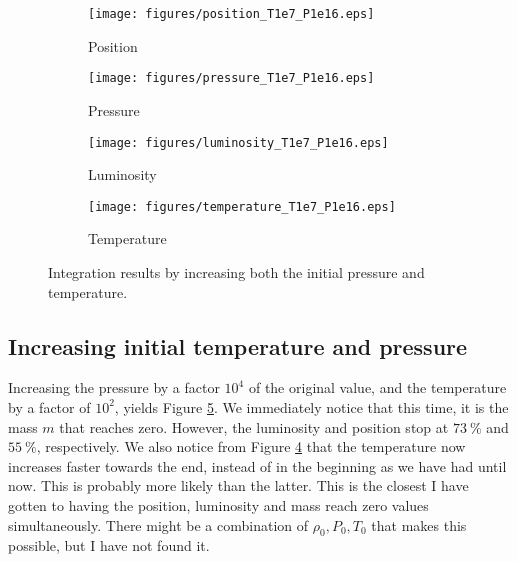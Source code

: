 \documentclass[a4paper, 11pt, english]{article}
\newcommand{\refig}[1]{\textcolor{blue}{\ref{fig:#1}}} %
\begin{document}
\begin{figure}[htpb]
	\begin{subfigure}{0.49\textwidth}
		\texttt{[image: figures/position\_T1e7\_P1e16.eps]}
		\caption{Position}
		\label{fig:position_T1e7_P1e16}
	\end{subfigure}\hfill
	\begin{subfigure}{0.49\textwidth}
		\texttt{[image: figures/pressure\_T1e7\_P1e16.eps]}
		\caption{Pressure}
		\label{fig:pressure_T1e7_P1e16}
	\end{subfigure}\hfill
	\vspace{0.35cm}
	\begin{subfigure}{0.49\textwidth}
		\texttt{[image: figures/luminosity\_T1e7\_P1e16.eps]}
		\caption{Luminosity}
		\label{fig:luminosity_T1e7_P1e16}
	\end{subfigure}\hfill
	\begin{subfigure}{0.49\textwidth}
		\texttt{[image: figures/temperature\_T1e7\_P1e16.eps]}
		\caption{Temperature}
		\label{fig:temperature_T1e7_P1e16}
	\end{subfigure}
	\vspace{0.2cm}
	\caption{Integration results by increasing both the initial pressure and temperature.}
	\label{fig:T1e7_P1e16}
\end{figure}

\subsection{Increasing initial temperature and pressure}
Increasing the pressure by a factor $10^4$ of the original value, and the temperature by a
factor of $10^2$, yields Figure \refig{T1e7_P1e16}. We immediately notice that this time,
it is the mass $m$ that reaches zero. However, the luminosity and position stop at
$73 \ \%$ and $55 \ \%$, respectively. We also notice from Figure
\refig{temperature_T1e7_P1e16} that the temperature now increases faster towards the end,
instead of in the beginning as we have had until now. This is probably more likely than
the latter. This is the closest I have gotten to having the position, luminosity and mass
reach zero values simultaneously. There might be a combination of $\rho_0, P_0, T_0$ that
makes this possible, but I have not found it.
\end{document}
